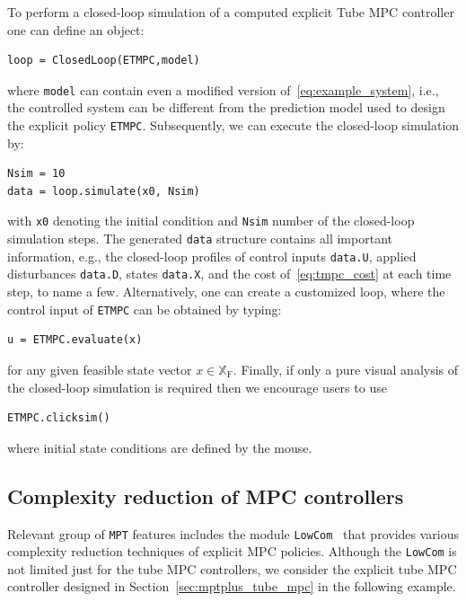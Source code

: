 \documentclass[letterpaper, 10 pt, conference]{ieeeconf}
\begin{document}
To perform a closed-loop simulation of a computed explicit Tube MPC controller one can define an object:
\begin{verbatim}
loop = ClosedLoop(ETMPC,model)
\end{verbatim}
where \verb|model| can contain even a modified version of~\eqref{eq:example_system}, i.e., the controlled system can be different from the prediction model used to design the explicit policy \verb|ETMPC|. Subsequently, we can execute the closed-loop simulation by:
\begin{verbatim}
Nsim = 10
data = loop.simulate(x0, Nsim)
\end{verbatim}	
with \verb|x0| denoting the initial condition and \verb|Nsim| number of the closed-loop simulation steps. The generated \verb|data| structure contains all important information, e.g., the closed-loop profiles of control inputs \verb|data.U|, applied disturbances \verb|data.D|, states \verb|data.X|, and the cost of~\eqref{eq:tmpc_cost} at each time step, to name a few.
Alternatively, one can create a customized loop, where the control input of \verb|ETMPC| can be obtained by typing: 
\begin{verbatim}
u = ETMPC.evaluate(x)
\end{verbatim}
for any given feasible state vector $x\in\mathbb{X}_{\mathrm{F}}$.
%
Finally, if only a pure visual analysis of the closed-loop simulation is required then we encourage users to use
\begin{verbatim}
ETMPC.clicksim()
\end{verbatim}
where initial state conditions are defined by the mouse.
%

\subsection{Complexity reduction of MPC controllers}
\label{sec:code_mpt3lowcom}

Relevant group of \texttt{MPT} features includes the module \texttt{LowCom}~\cite{KH15} that provides various complexity reduction techniques of explicit MPC policies. Although the \texttt{LowCom} is not limited just for the tube MPC controllers, we consider the explicit tube MPC controller designed in Section~\ref{sec:mptplus_tube_mpc} in the following example.
\end{document}
